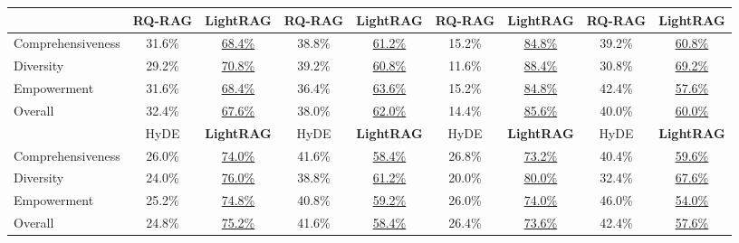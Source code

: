 \documentclass{article} %
\begin{document}
\begin{table}[t]
{\begin{tabular}{@{}lcccccccc@{}}
\cmidrule(lr){2-3} \cmidrule(lr){4-5} \cmidrule(lr){6-7} \cmidrule(lr){8-9}
                      & RQ-RAG & \textbf{LightRAG} & RQ-RAG & \textbf{LightRAG} & RQ-RAG & \textbf{LightRAG} & RQ-RAG & \textbf{LightRAG} \\
\midrule
Comprehensiveness      & 31.6\%      & \underline{68.4\%}     & 38.8\%      & \underline{61.2\%}     & 15.2\%      & \underline{84.8\%}     & 39.2\%      & \underline{60.8\%}     \\
Diversity              & 29.2\%      & \underline{70.8\%}     & 39.2\%      & \underline{60.8\%}     & 11.6\%      & \underline{88.4\%}     & 30.8\%      & \underline{69.2\%}     \\
Empowerment            & 31.6\%      & \underline{68.4\%}     & 36.4\%      & \underline{63.6\%}     & 15.2\%      & \underline{84.8\%}     & 42.4\%      & \underline{57.6\%}     \\
Overall         & 32.4\%      & \underline{67.6\%}     & 38.0\%      & \underline{62.0\%}     & 14.4\%      & \underline{85.6\%}     & 40.0\%      & \underline{60.0\%}     \\
\cmidrule(lr){2-3} \cmidrule(lr){4-5} \cmidrule(lr){6-7} \cmidrule(lr){8-9}
                      & HyDE & \textbf{LightRAG} & HyDE & \textbf{LightRAG} & HyDE & \textbf{LightRAG} & HyDE & \textbf{LightRAG} \\
\midrule
Comprehensiveness      & 26.0\%      & \underline{74.0\%}     & 41.6\%      & \underline{58.4\%}     & 26.8\%      & \underline{73.2\%}     & 40.4\%      & \underline{59.6\%}     \\
Diversity              & 24.0\%      & \underline{76.0\%}     & 38.8\%      & \underline{61.2\%}     & 20.0\%      & \underline{80.0\%}     & 32.4\%      & \underline{67.6\%}     \\
Empowerment            & 25.2\%      & \underline{74.8\%}     & 40.8\%      & \underline{59.2\%}     & 26.0\%      & \underline{74.0\%}     & 46.0\%      & \underline{54.0\%}     \\
Overall         & 24.8\%      & \underline{75.2\%}     & 41.6\%      & \underline{58.4\%}     & 26.4\%      & \underline{73.6\%}     & 42.4\%      & \underline{57.6\%}     \\

\end{tabular}}
\end{table}
\end{document}
